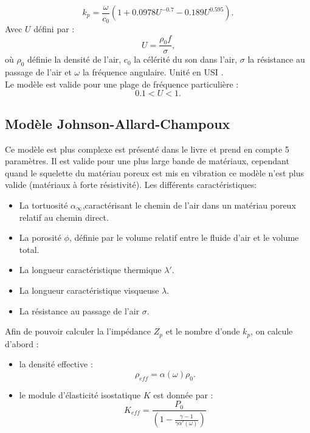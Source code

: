 \documentclass[12pt,foolscap]{report}
\begin{document}
	\begin{equation}
	k_p = \frac{\omega}{c_0}(1 + 0.0978U^{-0.7}-  0.189U^{0.595}) \text{.}
	\end{equation}
	Avec 	$U$  défini par :
	\begin{equation}
	U=\frac{\rho_0 f}{\sigma} \text{,}
	\end{equation}
	où $\rho_0$ définie la densité de l'air, $c_0$ la célérité du son dans l'air, $\sigma$  la résistance au passage de l’air  et $\omega$ la fréquence angulaire. Unité en USI .\\
	
	Le modèle est valide pour une plage de fréquence particulière :
	\begin{equation}
	0.1 < U < 1.
	\end{equation}
	
	
	\subsection{Modèle Johnson-Allard-Champoux}
	Ce modèle est plus complexe est présenté dans le livre \cite{allard_propagation_2009} et prend en compte 5 paramètres. Il est valide pour une plus large bande de matériaux, cependant quand le squelette du matériau poreux est mis en vibration ce modèle n'est plus valide (matériaux à forte résistivité). Les différents caractéristiques:
	\begin{itemize}
		\item La tortuosité $\alpha_\infty$,caractérisant  le chemin de l'air dans un matériau poreux relatif au chemin direct.
		\item La porosité $\phi$, définie par le volume relatif entre le fluide d'air  et le volume total.
		\item La longueur caractéristique thermique $\lambda'$.
		\item La longueur caractéristique visqueuse $\lambda$.
		\item La résistance au passage de l'air $\sigma$. \\
	\end{itemize} 
	Afin de pouvoir calculer la l'impédance $Z_p$ et le nombre d'onde $k_p$, on calcule d'abord :
	\begin{itemize}
		\item la densité effective :
		\begin{equation}
		\rho_{eff} = \alpha(\omega) \rho_0.
		\label{eq:rhoeff}
		\end{equation}
		\item le module d'élasticité isostatique $K$ est donnée par :
		\begin{equation}
		K_{eff}= \frac{P_0}{\left(1- \frac{\gamma-1}{\gamma \alpha'(\omega)}\right)}
		\end{equation}
	\end{itemize}
\end{document}
